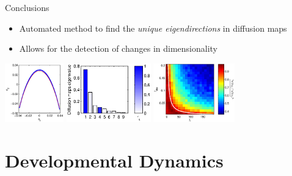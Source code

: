 \documentclass[12pt]{beamer}
\begin{document}
\begin{frame}{Conclusions}

\begin{itemize}
\item Automated method to find the {\em unique eigendirections} in diffusion maps
\item Allows for the detection of changes in dimensionality
\end{itemize}

\vfill

\includegraphics[height=1in]{strip_corr_12_fitline}
\hfill
\includegraphics[height=1in]{strip_evals_color}
\hfill
\includegraphics[height=1in]{tmax_lambda_transition}

\end{frame}

\section{Developmental Dynamics}
\end{document}
